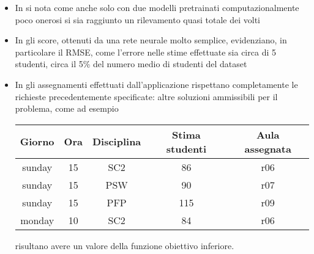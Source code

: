 \begin{itemize}
    \item In \textbf{} si nota come anche solo con due modelli pretrainati
        computazionalmente poco onerosi si sia raggiunto un rilevamento quasi totale dei volti
    \item In \textbf{} gli score, ottenuti da una rete neurale molto semplice,
        evidenziano, in particolare il RMSE, come l'errore nelle stime effettuate sia circa 
        di 5 studenti, circa il 5\% del numero medio di studenti del dataset
    \item In \textbf{} gli assegnamenti effettuati dall'applicazione rispettano
        completamente le richieste precedentemente specificate: altre soluzioni ammissibili per il problema,
        come ad esempio 

        \begin{table}[h]
            \begin{small}
                \begin{center}
                    \begin{tabular}[c]{c|c|c|c|c}
                        Giorno & Ora & Disciplina & Stima studenti & Aula assegnata \\
                        \hline
                        sunday & 15 & SC2 & 86 & r06 \\
                        sunday & 15 & PSW & 90 & r07 \\
                        sunday & 15 & PFP & 115 & r09 \\
                        monday & 10 & SC2 & 84 & r06
                    \end{tabular}
                \end{center}
            \end{small}
        \end{table}

        risultano avere un valore della funzione obiettivo inferiore.

    \end{itemize}
